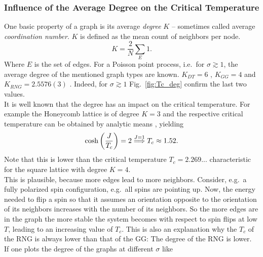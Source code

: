     \subsubsection{Influence of the Average Degree on the Critical Temperature}
        One basic property of a graph is its average \emph{degree} \(K\) -- sometimes
        called average \emph{coordination number}. \(K\) is defined as the mean count
        of neighbors per node.
        \begin{equation}
            K = \frac{2}{N} \sum_{E} 1.
            \label{eq:degree}
        \end{equation}
        Where \(E\) is the set of edges.
        For a Poisson point process, i.e.\ for \(\sigma \gtrsim 1\),
        the average degree of the mentioned graph types are known.
        \(K_{DT} = 6\) \cite{DelaunayDegree}, \(K_{GG} = 4\) \cite{notPChristoph} and \(K_{RNG} = 2.5576(3)\) \cite{RNGCell}.
        Indeed, for \(\sigma \gtrsim 1\) Fig.\ \ref{fig:Tc_deg}
        confirm the last two values.\\
        It is well known that the degree has an impact on the critical temperature.
        For example the Honeycomb lattice is of degree \(K=3\) and the
        respective critical temperature can be obtained by analytic means \cite{Wannier1945},
        yielding
        \begin{equation}
            \cosh\left(\frac{J}{T_c}\right)=2 \overset{J=1}{\Longrightarrow} T_c \approx 1.52.
            \label{eq:exactHCTc}
        \end{equation}
        Note that this is lower than the critical temperature \(T_c = 2.269...\)
        characteristic for the square lattice with degree \(K=4\).\\
        This is plausible, because more edges lead to more neighbors.
        Consider, e.g.\ a fully polarized spin configuration, e.g.\ all
        spins are pointing up. Now, the energy needed to flip a spin so
        that it assumes an orientation opposite to the orientation of its
        neighbors increases with the number of its neighbors. So the more edges are in
        the graph the more stable the system becomes with respect to spin flips
        at low \(T\), leading to an increasing value of \(T_c\).
        This is also an explanation why the \(T_c\) of the RNG is always
        lower than that of the GG: The degree of the RNG is lower.\\
        If one plots the degree of the graphs at different \(\sigma\) like
